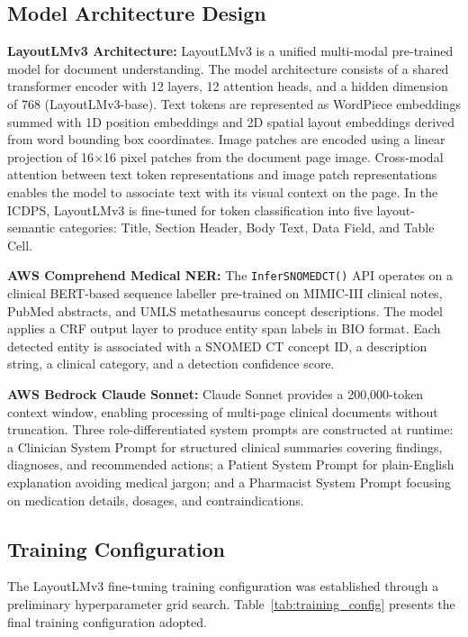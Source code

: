 \subsection{Model Architecture Design}

\textbf{LayoutLMv3 Architecture:} LayoutLMv3 is a unified multi-modal pre-trained model for document understanding. The model architecture consists of a shared transformer encoder with 12 layers, 12 attention heads, and a hidden dimension of 768 (LayoutLMv3-base). Text tokens are represented as WordPiece embeddings summed with 1D position embeddings and 2D spatial layout embeddings derived from word bounding box coordinates. Image patches are encoded using a linear projection of 16$\times$16 pixel patches from the document page image. Cross-modal attention between text token representations and image patch representations enables the model to associate text with its visual context on the page. In the ICDPS, LayoutLMv3 is fine-tuned for token classification into five layout-semantic categories: Title, Section Header, Body Text, Data Field, and Table Cell.

\textbf{AWS Comprehend Medical NER:} The \texttt{InferSNOMEDCT()} API operates on a clinical BERT-based sequence labeller pre-trained on MIMIC-III clinical notes, PubMed abstracts, and UMLS metathesaurus concept descriptions. The model applies a CRF output layer to produce entity span labels in BIO format. Each detected entity is associated with a SNOMED CT concept ID, a description string, a clinical category, and a detection confidence score.

\textbf{AWS Bedrock Claude Sonnet:} Claude Sonnet provides a 200,000-token context window, enabling processing of multi-page clinical documents without truncation. Three role-differentiated system prompts are constructed at runtime: a Clinician System Prompt for structured clinical summaries covering findings, diagnoses, and recommended actions; a Patient System Prompt for plain-English explanation avoiding medical jargon; and a Pharmacist System Prompt focusing on medication details, dosages, and contraindications.

\subsection{Training Configuration}
The LayoutLMv3 fine-tuning training configuration was established through a preliminary hyperparameter grid search. Table~\ref{tab:training_config} presents the final training configuration adopted.

